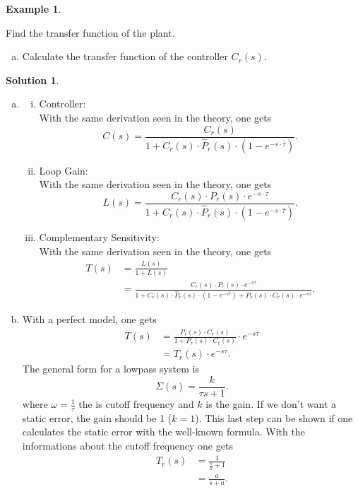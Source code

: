\documentclass[a4paper,12 pt]{article}
\numberwithin{equation}{section}
\theoremstyle{definition}
\newtheorem{bsp}{Example}
\theoremstyle{remark}
\theoremstyle{definition}
\newtheorem*{lsg}{Solution}
\theoremstyle{definition}
\theoremstyle{definition}
\theoremstyle{remark}
\begin{document}
\begin{bsp}
\begin{enumerate}[(c)]
Find the transfer function of the plant.
\end{enumerate}

\begin{enumerate}[(d)]
\item Calculate the transfer function of the controller $C_r(s)$.
\end{enumerate}
\newpage
\begin{lsg} \
\begin{enumerate}[(a)]
\item \begin{enumerate}[i)]
\item Controller:\\
With the same derivation seen in the theory, one gets
\begin{equation*}
C(s)=\frac{C_r(s)}{1+C_r(s)\cdot\hat P_r(s)\cdot(1-e^{-s\cdot\hat{\tau}})}.
\end{equation*}
\item Loop Gain:\\
With the same derivation seen in the theory, one gets
\begin{equation*}
L(s)=\frac{C_r(s)\cdot P_r(s)\cdot e^{-s\cdot \tau}}{1+C_r(s)\cdot\hat P_r(s)\cdot(1-e^{-s\cdot\hat{\tau}})}.
\end{equation*}
\item Complementary Sensitivity:\\
With the same derivation seen in the theory, one gets
\begin{equation*}
\begin{split}
T(s)&=\frac{L(s)}{1+L(s)}\\
&=\frac{C_r(s)\cdot P_r(s)\cdot e^{-s\tau}}{1+C_r(s)\cdot \hat{P}_r(s)\cdot(1-e^{-s\hat{\tau}})+P_r(s)\cdot C_r(s)\cdot e^{-s\tau}}.
\end{split}
\end{equation*}


\end{enumerate}
\item With a perfect model, one gets
\begin{equation*}
\begin{split}
T(s)&=\frac{P_r(s)\cdot C_r(s)}{1+P_r(s)\cdot C_r(s)}\cdot e^{-s\tau}\\
&= T_r(s)\cdot e^{-s\tau}.
\end{split}
\end{equation*}
The general form for a lowpass system is
\begin{equation*}
\Sigma(s)=\frac{k}{\tau s+1}.
\end{equation*}
where $\omega=\frac{1}{\tau}$ the is cutoff frequency and $k$ is the gain. If we don't want a static error, the gain should be 1 ($k=1$).  This last step can be shown if one calculates the static error with the well-known formula. With the informations about the cutoff frequency one gets
\begin{equation*}
\begin{split}
T_r(s)&=\frac{1}{\frac{s}{a}+1}\\
&=\frac{a}{s+a}.
\end{split}
\end{equation*}


\end{enumerate}
\end{lsg}
\end{bsp}
\end{document}
